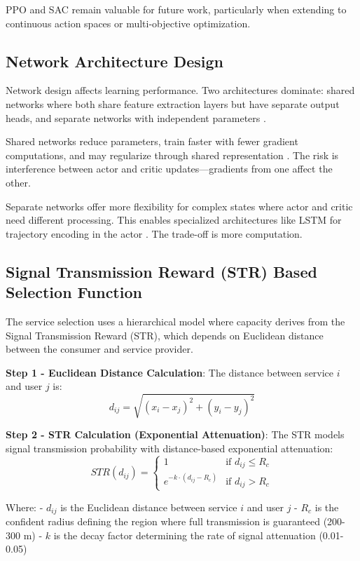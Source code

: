 \documentclass[10pt,twocolumn]{article}
\begin{document}
PPO and SAC remain valuable for future work, particularly when
extending to continuous action spaces or multi-objective
optimization.

\subsection{Network Architecture Design}\label{network-architecture-design}

Network design affects learning performance. Two architectures dominate:
shared networks where both share feature extraction layers but have
separate output heads, and separate networks with independent parameters
\nocite{mnih2016}.

Shared networks reduce parameters, train faster with fewer gradient
computations, and may regularize through shared representation \nocite{mnih2016}. The risk
is interference between actor and critic updates---gradients from one
affect the other.

Separate networks offer more flexibility for complex states where actor
and critic need different processing. This enables specialized
architectures like LSTM for trajectory encoding in the actor
\nocite{chen2020}\nocite{wang2024a}. The trade-off is more computation.

\subsection{Signal Transmission Reward (STR) Based Selection Function}\label{signal-transmission-reward-str-based-selection-function}

The service selection uses a hierarchical model where capacity derives
from the Signal Transmission Reward (STR), which depends on Euclidean
distance between the consumer and service provider.

\textbf{Step 1 - Euclidean Distance Calculation}: The distance between
service \(i\) and user \(j\) is:
\[d_{ij} = \sqrt{(x_i - x_j)^2 + (y_i - y_j)^2}\]

\textbf{Step 2 - STR Calculation (Exponential Attenuation)}: The STR
models signal transmission probability with distance-based exponential
attenuation:
\[STR(d_{ij}) = \begin{cases} 1 & \text{if } d_{ij} \leq R_c \\ e^{-k \cdot (d_{ij} - R_c)} & \text{if } d_{ij} > R_c \end{cases}\]

Where: - \(d_{ij}\) is the Euclidean distance between service \(i\) and
user \(j\) - \(R_c\) is the confident radius defining the region where
full transmission is guaranteed (200-300 m) - \(k\) is the decay factor
determining the rate of signal attenuation (0.01-0.05)
\end{document}
